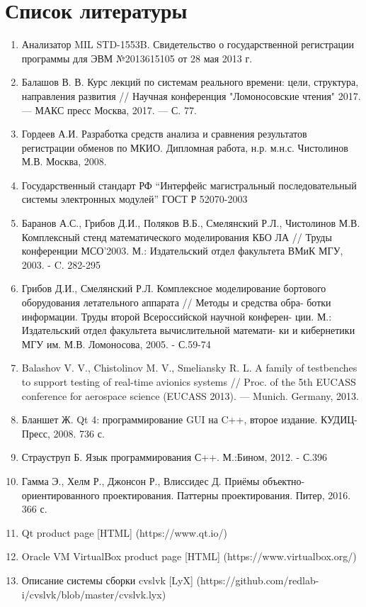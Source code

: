 \section*{Список литературы}

\begin{enumerate}
 \sloppy
 \item \label{opermon_reg} Анализатор MIL STD-1553B. Свидетельство о 
государственной регистрации программы для ЭВМ №2013615105 от 28 мая 2013 г.
 \item \label{vius_rv_course} Балашов В. В. Курс лекций по системам реального 
времени: цели, структура, направления развития // Научная конференция 
"Ломоносовские чтения" 2017. — МАКС пресс Москва, 2017. — С. 77. 
 \item \label{gordeev_diploma} Гордеев А.И. Разработка средств анализа и 
сравнения результатов регистрации обменов по МКИО. Дипломная работа, н.р. 
м.н.с. Чистолинов М.В. Москва, 2008.
 \item \label{gost_r_52070-2003} Государственный стандарт РФ ``Интерфейс 
магистральный последовательный системы электронных модулей'' ГОСТ Р 52070-2003
 \item \label{stand} Баранов А.С., Грибов Д.И., Поляков В.Б., Смелянский Р.Л., 
Чистолинов М.В. Комплексный стенд математического моделирования
КБО ЛА // Труды конференции МСО'2003. М.: Издательский отдел
факультета ВМиК МГУ, 2003. - C. 282-295
 \item \label{stand2} Грибов Д.И., Смелянский Р.Л. Комплексное моделирование 
бортового оборудования летательного аппарата // Методы и средства обра-
ботки информации. Труды второй Всероссийской научной конферен-
ции. М.: Издательский отдел факультета вычислительной математи-
ки и кибернетики МГУ им. М.В. Ломоносова, 2005. - С.59-74 
 \item \label{stand3} Balashov V. V., Chistolinov M. V., Smeliansky R. L. A 
family of testbenches to support testing of real-time avionics systems // Proc. 
of the 5th EUCASS conference for aerospace science (EUCASS 2013). — Munich. 
Germany, 2013. 
 \item \label{blanshet_qt4} Бланшет Ж. Qt 4: программирование GUI на C++, 
второе издание. КУДИЦ-Пресс, 2008. 736 с.
 \item \label{straustrup} Страуструп Б. Язык программирования С++. М.:Бином, 
2012. - С.396
 \item \label{gof} Гамма Э., Хелм Р., Джонсон Р., Влиссидес Д. Приёмы 
объектно-ориентированного проектирования. Паттерны проектирования. Питер, 2016. 
366 с.
 \item \label{qt_ref} Qt product page [HTML] (https://www.qt.io/)
 \item \label{virtualbox} Oracle VM VirtualBox product page [HTML] 
(https://www.virtualbox.org/)
 \item \label{cvslvk} Описание системы сборки cvslvk [LyX] 
(https://github.com/redlab-i/cvslvk/blob/master/cvslvk.lyx)
\end{enumerate}
